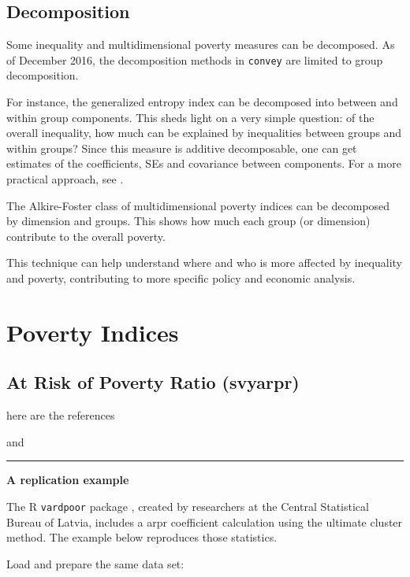 \documentclass[]{book}
\theoremstyle{definition}
\theoremstyle{definition}
\theoremstyle{remark}
\begin{document}
\section{Decomposition}\label{decomposition}

Some inequality and multidimensional poverty measures can be decomposed.
As of December 2016, the decomposition methods in \texttt{convey} are
limited to group decomposition.

For instance, the generalized entropy index can be decomposed into
between and within group components. This sheds light on a very simple
question: of the overall inequality, how much can be explained by
inequalities between groups and within groups? Since this measure is
additive decomposable, one can get estimates of the coefficients, SEs
and covariance between components. For a more practical approach, see
\citep{lima2013}.

The Alkire-Foster class of multidimensional poverty indices can be
decomposed by dimension and groups. This shows how much each group (or
dimension) contribute to the overall poverty.

This technique can help understand where and who is more affected by
inequality and poverty, contributing to more specific policy and
economic analysis.

\chapter{Poverty Indices}\label{poverty}

\section{At Risk of Poverty Ratio
(svyarpr)}\label{at-risk-of-poverty-ratio-svyarpr}

here are the references

\citep{osier2009} and \citep{deville1999}

\begin{center}\rule{0.5\linewidth}{\linethickness}\end{center}

\textbf{A replication example}

The R \texttt{vardpoor} package \citep{vardpoor}, created by researchers
at the Central Statistical Bureau of Latvia, includes a arpr coefficient
calculation using the ultimate cluster method. The example below
reproduces those statistics.

Load and prepare the same data set:
\end{document}
